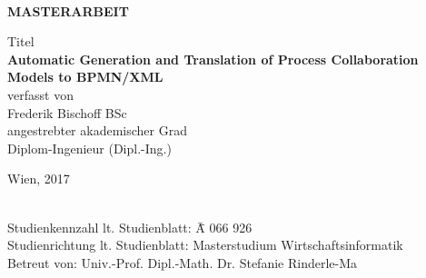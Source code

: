 \documentclass[a4paper, 12pt, oneside, BCOR1cm,toc=chapterentrywithdots]{scrbook}
\begin{document}
%
%

\begin{titlepage}

{
    \begin{center}
        \\
    \end{center}
    \vspace{1.5cm}
}

\begin{center}


\LARGE{\textbf{MASTERARBEIT}}\\
\vspace{1.5cm}

\small{Titel}\\
\Large{\textbf{Automatic Generation and Translation of Process Collaboration Models to BPMN/XML}}\\ 
\vspace{2cm}
\small {verfasst von}\\
\large Frederik Bischoff BSc\\
\vspace{0.7cm}
\small angestrebter akademischer Grad\\
\large Diplom-Ingenieur (Dipl.-Ing.)\\
\end{center}
\vspace{3cm}
\small 
Wien, 2017\\
\vspace{2cm}\\
\begin{tabbing}
Studienkennzahl lt. Studienblatt: \= \= \= A 066 926\\
Studienrichtung lt. Studienblatt: \> Masterstudium Wirtschaftsinformatik\\
Betreut von: \> Univ.-Prof. Dipl.-Math. Dr. Stefanie Rinderle-Ma\\
\end{tabbing}

\end{titlepage}
\end{document}
